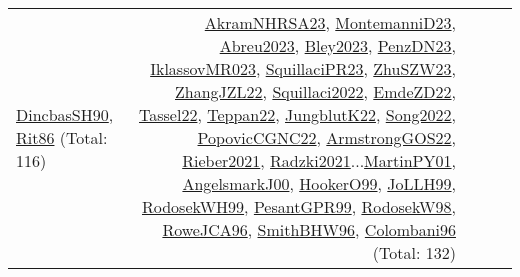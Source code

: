 {\begin{longtable}{p{3cm}r>{\raggedright\arraybackslash}p{6cm}>{\raggedright\arraybackslash}p{6cm}>{\raggedright\arraybackslash}p{8cm}}
\hyperref[detail:DincbasSH90]{DincbasSH90}, \hyperref[detail:Rit86]{Rit86} (Total: 116) & \hyperref[detail:AkramNHRSA23]{AkramNHRSA23}, \hyperref[detail:MontemanniD23]{MontemanniD23}, \hyperref[detail:Abreu2023]{Abreu2023}, \hyperref[detail:Bley2023]{Bley2023}, \hyperref[detail:PenzDN23]{PenzDN23}, \hyperref[detail:IklassovMR023]{IklassovMR023}, \hyperref[detail:SquillaciPR23]{SquillaciPR23}, \hyperref[detail:ZhuSZW23]{ZhuSZW23}, \hyperref[detail:ZhangJZL22]{ZhangJZL22}, \hyperref[detail:Squillaci2022]{Squillaci2022}, \hyperref[detail:EmdeZD22]{EmdeZD22}, \hyperref[detail:Tassel22]{Tassel22}, \hyperref[detail:Teppan22]{Teppan22}, \hyperref[detail:JungblutK22]{JungblutK22}, \hyperref[detail:Song2022]{Song2022}, \hyperref[detail:PopovicCGNC22]{PopovicCGNC22}, \hyperref[detail:ArmstrongGOS22]{ArmstrongGOS22}, \hyperref[detail:Rieber2021]{Rieber2021}, \hyperref[detail:Radzki2021]{Radzki2021}...\hyperref[detail:MartinPY01]{MartinPY01}, \hyperref[detail:AngelsmarkJ00]{AngelsmarkJ00}, \hyperref[detail:HookerO99]{HookerO99}, \hyperref[detail:JoLLH99]{JoLLH99}, \hyperref[detail:RodosekWH99]{RodosekWH99}, \hyperref[detail:PesantGPR99]{PesantGPR99}, \hyperref[detail:RodosekW98]{RodosekW98}, \hyperref[detail:RoweJCA96]{RoweJCA96}, \hyperref[detail:SmithBHW96]{SmithBHW96}, \hyperref[detail:Colombani96]{Colombani96} (Total: 132)\\

\end{longtable}}
